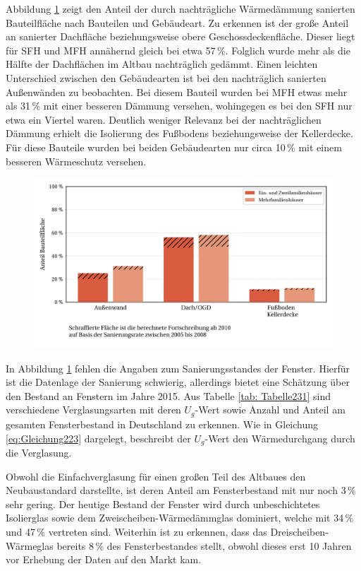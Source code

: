 Abbildung \ref{fig: Abbildung231} zeigt den Anteil der durch nachträgliche Wärmedämmung sanierten Bauteilfläche nach Bauteilen und Gebäudeart.
Zu erkennen ist der große Anteil an sanierter Dachfläche beziehungsweise obere Geschossdeckenfläche.
Dieser liegt für SFH und MFH annähernd gleich bei etwa 57\,\%.
Folglich wurde mehr als die Hälfte der Dachflächen im Altbau nachträglich gedämmt.
Einen leichten Unterschied zwischen den Gebäudearten ist bei den nachträglich sanierten Außenwänden zu beobachten. 
Bei diesem Bauteil wurden bei MFH etwas mehr als 31\,\% mit einer besseren Dämmung versehen, wohingegen es bei den SFH nur etwa ein Viertel waren.
Deutlich weniger Relevanz bei der nachträglichen Dämmung erhielt die Isolierung des Fußbodens beziehungsweise der Kellerdecke. 
Für diese Bauteile wurden bei beiden Gebäudearten nur circa 10\,\% mit einem besseren Wärmeschutz versehen. 

\begin{figure}[H]
	\centering
		\includegraphics{Pictures/NachtraeglicheSanierung.jpg}
	\caption{\cite{Bigalke.2016}}
	\label{fig: Abbildung231} 
\end{figure}

In Abbildung \ref{fig: Abbildung231} fehlen die Angaben zum Sanierungsstandes der Fenster.
Hierfür ist die Datenlage der Sanierung schwierig, allerdings bietet \cite{Bigalke.2016} eine Schätzung über den Bestand an Fenstern im Jahre 2015.
Aus Tabelle \ref{tab: Tabelle231} sind verschiedene Verglasungsarten mit deren \(U_g\)-Wert sowie Anzahl und Anteil am gesamten Fensterbestand in Deutschland zu erkennen.
Wie in Gleichung \ref{eq:Gleichung223} dargelegt, beschreibt der \(U_g\)-Wert den Wärmedurchgang durch die Verglasung.

Obwohl die Einfachverglasung für einen großen Teil des Altbaues den Neubaustandard darstellte, ist deren Anteil am Fensterbestand mit nur noch 3\,\% sehr gering. 
Der heutige Bestand der Fenster wird durch unbeschichtetes Isolierglas sowie dem Zweischeiben-Wärmedämmglas dominiert, welche mit 34\,\% und 47\,\% vertreten sind.
Weiterhin ist zu erkennen, dass das Dreischeiben-Wärmeglas bereits 8\,\% des Fensterbestandes stellt, obwohl dieses erst 10 Jahren vor Erhebung der Daten auf den Markt kam.

